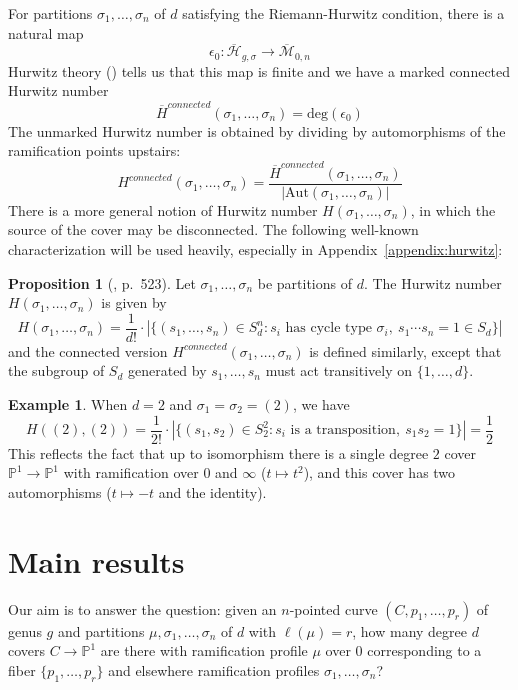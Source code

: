 \documentclass[thesis]{thesis-umich}           %
\newcommand{\Aut}{\text{Aut}}
\newcommand{\Hb}{\overline{\mathcal H}}
\renewcommand{\P}{\mathbb P}
\theoremstyle{definition}
\newtheorem{prop}[thm]{Proposition}
\newtheorem{eg}[thm]{Example}
\begin{document}
For partitions $\sigma_1,\dots,\sigma_n$ of $d$
satisfying the Riemann-Hurwitz condition, there is a natural map
\[
\epsilon_0:\Hb_{g,\sigma}\to\overline{\mathcal M}_{0,n}
\]
Hurwitz theory (\cite{Cela}) tells us that this map is finite and we have a marked connected Hurwitz number
\[\overline H^{connected}(\sigma_1,\dots,\sigma_n)=\text{deg}(\epsilon_0)\]
The unmarked Hurwitz number is obtained by dividing by automorphisms of the ramification points upstairs:
\[
H^{connected}(\sigma_1,\dots,\sigma_n)=\frac{\overline H^{connected}(\sigma_1,\dots,\sigma_n)}{|\Aut(\sigma_1,\dots,\sigma_n)|}
\]
There is a more general notion of Hurwitz number $H(\sigma_1,\dots,\sigma_n)$, in which the source of
the cover may be disconnected.
The following well-known characterization will be used heavily,
especially in Appendix~\ref{appendix:hurwitz}:
\begin{prop}[\cite{Completed}, p.\ 523]
  Let $\sigma_1,\dots,\sigma_n$ be partitions of $d$. The Hurwitz number $H(\sigma_1,\dots,\sigma_n)$ is given by
  \[
  H(\sigma_1,\dots,\sigma_n)=\frac 1{d!}\cdot |\{(s_1,\dots,s_n)\in S_d^n:s_i\text{ has cycle type }\sigma_i,\ s_1\cdots s_n=1\in S_d\}|
  \]
  and the connected version $H^{connected}(\sigma_1,\dots,\sigma_n)$ is defined
  similarly, except that the subgroup of $S_d$ generated by $s_1,\dots,s_n$
  must act transitively on $\{1,\dots,d\}$.
\end{prop}
\begin{eg}
  When $d=2$ and $\sigma_1=\sigma_2=(2)$, we have
  \[
  H((2),(2))=\frac 1{2!}\cdot |\{(s_1,s_2)\in S_2^2:s_i\text{ is a transposition},\ s_1s_2=1\}|=\frac 12
  \]
  This reflects the fact that up to isomorphism there is a single degree $2$ cover $\P^1\to\P^1$ with ramification over $0$ and $\infty$ ($t\mapsto t^2$), and this cover has two automorphisms ($t\mapsto -t$ and the identity).
  \end{eg}

\section{Main results}

Our aim is to answer the question: given an $n$-pointed curve
$(C,p_1,\dots,p_r)$ of genus $g$ and
partitions $\mu,\sigma_1,\dots,\sigma_n$ of $d$ with $\ell(\mu)=r$,
how many degree $d$ covers $C\to\P^1$ are there with ramification profile $\mu$ over $0$
corresponding to a fiber $\{p_1,\dots,p_r\}$ and
elsewhere ramification profiles $\sigma_1,\dots,\sigma_n$?
\end{document}

